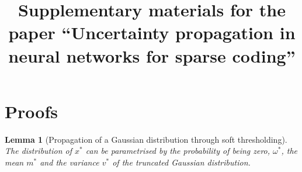 \documentclass{article}
\newtheorem{lemma}{Lemma}
\begin{document}
\title{Supplementary materials for the paper ``Uncertainty propagation in neural networks for sparse coding''}


\maketitle

\section{Proofs}

\begin{lemma}[Propagation of a Gaussian distribution through soft thresholding]
\label{thm:soft_thresholding}
The distribution of $x^*$ can be parametrised by the probability of being zero, $\omega^*$, the mean $m^*$ and the variance $v^*$ of the truncated Gaussian distribution.
\end{lemma}
\end{document}
